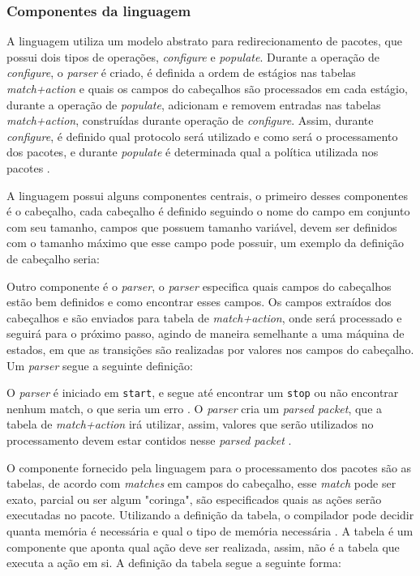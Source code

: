 \documentclass[
    12pt,
    openright, 
    oneside,
    a4paper,
    french,
    english,
    brazil
    ]{facom-ufu-abntex2}
\theoremstyle{definition}
\begin{document}
\subsubsection{Componentes da linguagem}

A linguagem utiliza um modelo abstrato para redirecionamento de pacotes, que possui
dois tipos de operações, \emph{configure} e \emph{populate}. Durante a operação
de \emph{configure}, o \emph{parser} é criado, é definida a ordem de estágios nas tabelas
\emph{match+action} e quais os campos do cabeçalhos são processados em cada estágio,
durante a operação de \emph{populate}, adicionam e removem entradas nas tabelas
\emph{match+action}, construídas durante operação de \emph{configure}. Assim,
durante \emph{configure}, é definido qual protocolo será utilizado e como será
o processamento dos pacotes, e durante \emph{populate} é determinada qual a 
política utilizada nos pacotes \cite{bosshart2014p4}.

A linguagem possui alguns componentes centrais, o primeiro desses componentes 
é o cabeçalho, cada cabeçalho é definido seguindo o nome do campo em conjunto 
com seu tamanho, campos que possuem tamanho variável, devem ser definidos com o
tamanho máximo que esse campo pode possuir, um exemplo da definição de cabeçalho
seria:



Outro componente é o \emph{parser}, o \emph{parser} especifica quais campos do cabeçalhos estão
bem definidos e como encontrar esses campos. Os campos extraídos dos cabeçalhos e 
são enviados para tabela de \emph{match+action}, onde será processado e seguirá
para o próximo passo, agindo de maneira semelhante a uma máquina de estados, em 
que as transições são realizadas por valores nos campos do cabeçalho. Um \emph{parser}
segue a seguinte definição:



O \emph{parser} é iniciado em \texttt{start}, e segue até encontrar um \texttt{stop} ou não
encontrar nenhum match, o que seria um erro \cite{bosshart2014p4}. O \emph{parser} cria um 
\emph{parsed packet}, que a tabela de \emph{match+action} irá utilizar,
assim, valores que serão utilizados no processamento devem estar contidos nesse
\emph{parsed packet} \cite{p4USITutorial}.

O componente fornecido pela linguagem para o processamento dos pacotes são as tabelas,
de acordo com \emph{matches} em campos do cabeçalho, esse \emph{match} pode ser exato, parcial 
ou ser algum "coringa", são especificados quais as ações serão executadas no
pacote. Utilizando a definição da tabela, o compilador pode decidir quanta memória 
é necessária e qual o tipo de memória necessária \cite{bosshart2014p4}. A
tabela é um componente que aponta qual ação deve ser realizada, assim, não é a 
tabela que executa a ação em si. A definição da tabela segue a seguinte forma:
\end{document}
